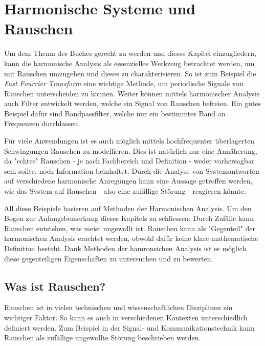 %
%
%
%

\section{Harmonische Systeme und Rauschen\label{brown:Rauschen}}

Um dem Thema des Buches gerecht zu werden und dieses Kapitel einzugliedern, kann die harmonische Analysis als essenzielles Werkzeug betrachtet werden, um mit Rauschen umzugehen und dieses zu charakterisieren. 
So ist zum Beispiel die \textit{Fast Fourrier Transform} eine wichtige Methode, um periodische Signale von Rauschen unterscheiden zu können. 
Weiter können mittels harmonischer Analysis auch Filter entwickelt werden, welche ein Signal von Rauschen befreien. Ein gutes Beispiel dafür sind Bandpassfilter, welche nur ein bestimmtes Band an Frequenzen durchlassen.


Für viele Anwendungen ist es auch möglich mittels hochfrequenter überlagerten Schwingungen Rauschen zu modellieren. Dies ist natürlich nur eine Annäherung, da "echtes" Rauschen - je nach Fachbereich und Definition - weder vorhersagbar sein sollte, noch Information beinhaltet. 
Durch die Analyse von Systemantworten auf verschiedene harmonische Anregungen kann eine Aussage getroffen werden, wie das System auf Rauschen - also eine zufällige Störung - reagieren könnte.


All diese Beispiele basieren auf Methoden der Harmonischen Analysis. Um den Bogen zur Anfangsbemerkung dieses Kapitels zu schliessen: Durch Zufälle kann Rauschen entstehen, was meist ungewollt ist. Rauschen kann als "Gegenteil" der harmonischen Analysis erachtet werden, obwohl dafür keine klare mathematische Definition besteht. Dank Methoden der hamronsichen Analysis ist es möglich diese gegenteiligen Eigenschaften zu untersuchen und zu bewerten.


\subsection{Was ist Rauschen?\label{brown:Rauschen:Arten}}
Rauschen ist in vielen technischen und wissenschaftlichen Disziplinen ein wichtiger Faktor. So kann es auch in verschiedenen Kontexten unterschiedlich definiert werden. Zum Beispiel in der Signal- und Kommunikationstechnik kann Rauschen als zufällige ungewollte Störung beschrieben werden. 


